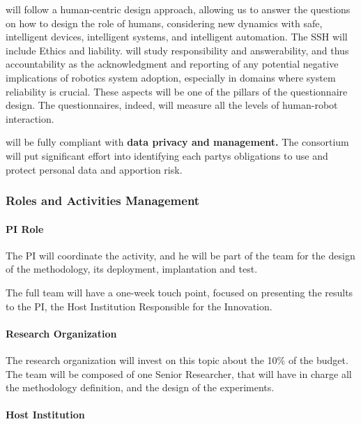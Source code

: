  will follow a human-centric design approach, allowing
us to answer the questions on how to design the role of humans,
considering new dynamics with safe, intelligent devices, intelligent
systems, and intelligent automation. The SSH will include Ethics and
liability.  will study responsibility and
answerability, and thus accountability as the acknowledgment and
reporting of any potential negative implications of robotics system
adoption, especially in domains where system reliability is crucial.
These aspects will be one of the pillars of the questionnaire design.
The questionnaires, indeed, will measure all the levels of human-robot
interaction.

 will be fully compliant with \textbf{data privacy and
management.} The consortium will put significant effort into identifying
each party\textquotesingle s obligations to use and protect personal
data and apportion risk.

\subsubsection{\texorpdfstring{Roles and Activities Management
}{Roles and Activities Management }}\label{roles-and-activities-management-3}

\paragraph{PI Role}\label{pi-role-3}

The PI will coordinate the activity, and he will be part of the team for
the design of the methodology, its deployment, implantation and test.

The full team will have a one-week touch point, focused on presenting
the results to the PI, the Host Institution Responsible for the
Innovation.

\paragraph{Research Organization}\label{research-organization-3}

The research organization will invest on this topic about the 10\% of
the budget. The team will be composed of one Senior Researcher, that
will have in charge all the methodology definition, and the design of
the experiments.

\paragraph{Host Institution}\label{host-institution-3}


